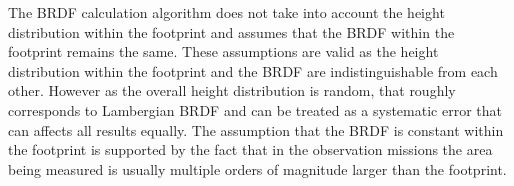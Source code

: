 The \ac{BRDF} calculation algorithm does not take into account the height distribution within the footprint and assumes that the \ac{BRDF} within the footprint remains the same. These assumptions are valid as the height distribution within the footprint and the \ac{BRDF} are indistinguishable from each other. However as the overall height distribution is random, that roughly corresponds to Lambergian \ac{BRDF} and can be treated as a systematic error that can affects all results equally. The assumption that the \ac{BRDF} is constant within the footprint is supported by the fact that in the observation missions the area being measured is usually multiple orders of magnitude larger than the footprint.




